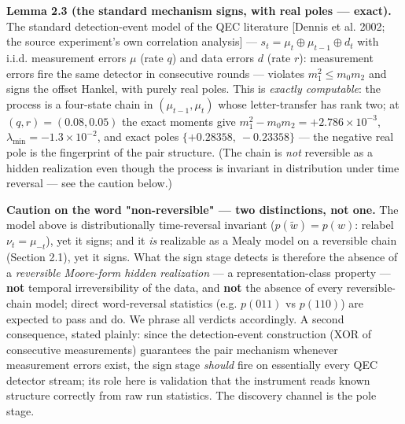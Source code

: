\documentclass[11pt]{article}
\begin{document}
\textbf{Lemma 2.3 (the standard mechanism signs, with real poles — exact).}  The standard detection-event model of the QEC literature [Dennis et al. 2002; the source experiment's own correlation analysis] — $s_t = \mu_t \oplus \mu_{t-1} \oplus d_t$ with i.i.d. measurement errors $\mu$ (rate $q$) and data errors $d$ (rate $r$): measurement errors fire the same detector in consecutive rounds — violates $m_1^2 \le m_0 m_2$ and signs the offset Hankel, with purely real poles.  This is \emph{exactly computable}: the process is a four-state chain in $(\mu_{t-1}, \mu_t)$ whose letter-transfer has rank two; at $(q, r) = (0.08, 0.05)$ the exact moments give $m_1^2 - m_0 m_2 = +2.786\times 10^{-3}$, $\lambda_{\min} = -1.3\times 10^{-2}$, and exact poles $\{+0.28358,\ -0.23358\}$ — the negative real pole is the fingerprint of the pair structure.  (The chain is \emph{not} reversible as a hidden realization even though the process is invariant in distribution under time reversal — see the caution below.)

\textbf{Caution on the word "non-reversible" — two distinctions, not one.}  The model above is distributionally time-reversal invariant ($p(\tilde w) = p(w)$: relabel $\nu_t = \mu_{-t}$), yet it signs; and it \emph{is} realizable as a Mealy model on a reversible chain (Section 2.1), yet it signs. What the sign stage detects is therefore the absence of a \emph{reversible Moore-form hidden realization} — a representation-class property — \textbf{not} temporal irreversibility of the data, and \textbf{not} the absence of every reversible-chain model; direct word-reversal statistics (e.g. $p(011)$ vs $p(110)$) are expected to pass and do. We phrase all verdicts accordingly.  A second consequence, stated plainly: since the detection-event construction (XOR of consecutive measurements) guarantees the pair mechanism whenever measurement errors exist, the sign stage \emph{should} fire on essentially every QEC detector stream; its role here is validation that the instrument reads known structure correctly from raw run statistics.  The discovery channel is the pole stage.
\end{document}
